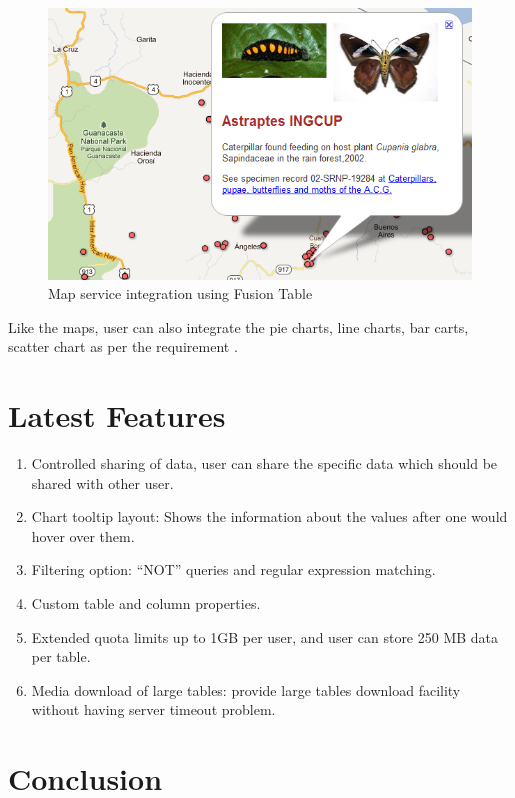\documentclass[9pt,twocolumn,twoside]{../../styles/osajnl}
\begin{document}
\begin{figure}[htbp]
	\centering
	\includegraphics[width=\linewidth]{images/ft_mapresult}
	\caption{Map service integration using Fusion Table \cite{www-8} }
	\label{fig:false-color}
\end{figure}


Like the maps, user can also integrate the pie charts, line charts, bar carts, scatter chart as per the requirement . 


\section{Latest Features}

\begin{enumerate}
	\item Controlled sharing of data, user can share the specific data which should be shared with other user.
	\item Chart tooltip layout: Shows the information about the values after one would hover over them.
	\item Filtering option: “NOT” queries and regular expression matching. 
	\item Custom table and column properties.
	\item Extended quota limits up to 1GB per user, and user can store 250 MB data per table.
	\item Media download of large tables: provide large tables download facility without having server timeout problem.

\end{enumerate}


\section{Conclusion}
\end{document}
